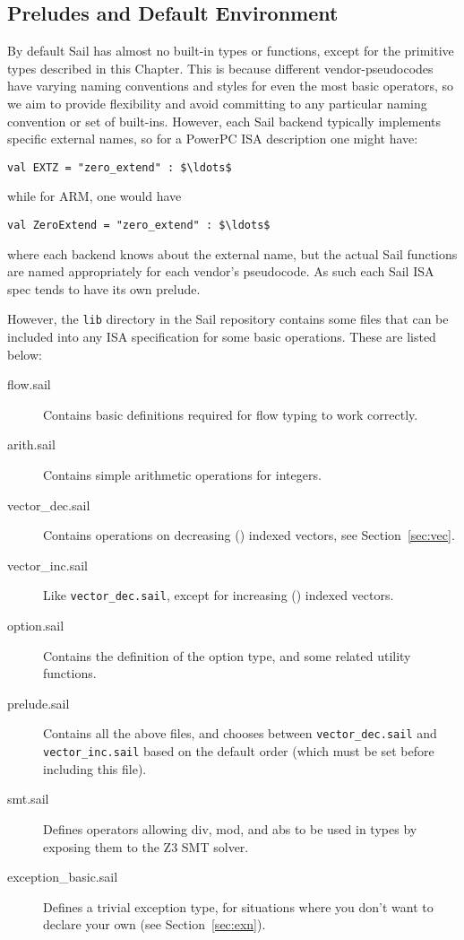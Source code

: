 \subsection{Preludes and Default Environment}
\label{sec:prelude}

By default Sail has almost no built-in types or functions, except for
the primitive types described in this Chapter. This is because
different vendor-pseudocodes have varying naming conventions and
styles for even the most basic operators, so we aim to provide
flexibility and avoid committing to any particular naming convention or
set of built-ins. However, each Sail backend typically implements
specific external names, so for a PowerPC ISA description one might
have:
\begin{lstlisting}[mathescape]
val EXTZ = "zero_extend" : $\ldots$
\end{lstlisting}
while for ARM, one would have
\begin{lstlisting}[mathescape]
val ZeroExtend = "zero_extend" : $\ldots$
\end{lstlisting}
where each backend knows about the  external name,
but the actual Sail functions are named appropriately for each
vendor's pseudocode. As such each Sail ISA spec tends to have its own
prelude.

However, the \verb+lib+ directory in the Sail repository contains some
files that can be included into any ISA specification for some basic
operations. These are listed below:
\begin{description}
  \item[flow.sail] Contains basic definitions required for flow
    typing to work correctly.
  \item[arith.sail] Contains simple arithmetic operations for
    integers.
  \item[vector\_dec.sail] Contains operations on decreasing
    () indexed vectors, see Section~\ref{sec:vec}.
  \item[vector\_inc.sail] Like \verb+vector_dec.sail+, except
    for increasing () indexed vectors.
  \item[option.sail] Contains the definition of the option
    type, and some related utility functions.
  \item[prelude.sail] Contains all the above files, and chooses
    between \verb+vector_dec.sail+ and \verb+vector_inc.sail+ based on
    the default order (which must be set before including this file).
  \item[smt.sail] Defines operators allowing div, mod, and abs
    to be used in types by exposing them to the Z3 SMT solver.
  \item[exception\_basic.sail] Defines a trivial exception type, for
    situations where you don't want to declare your own (see
    Section~\ref{sec:exn}).
\end{description}
